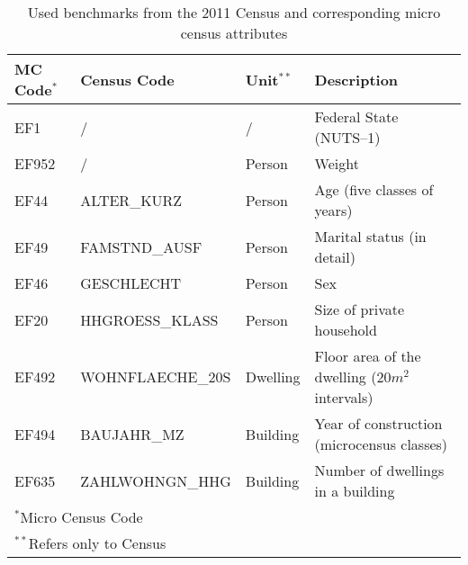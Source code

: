 \begin{table}[htb]
    \centering
    \caption{Used benchmarks from the 2011 Census and corresponding micro
    census attributes}\label{tab:data}
    \begin{tabular}{lllp{5.5cm}}
        \toprule
        \textbf{MC Code$^*$}\cite{NRW.2010} &
        \textbf{Census Code}\cite{NRW.2011} &
        \textbf{Unit$^{**}$} &
        \textbf{Description}\\
        \midrule
EF1       & / & /      & Federal State (NUTS--1)\\
EF952     & / & Person & Weight\\
EF44      & ALTER\_KURZ      & Person    & Age (five classes of years)\\
EF49      & FAMSTND\_AUSF    & Person    & Marital status (in detail)\\
EF46      & GESCHLECHT       & Person    & Sex\\
EF20      & HHGROESS\_KLASS  & Person    & Size of private household\\
          \midrule
EF492     & WOHNFLAECHE\_20S & Dwelling  & Floor area of the dwelling (20$m^2$ intervals)\\
          \midrule
EF494     & BAUJAHR\_MZ      & Building  & Year of construction (microcensus classes)\\
EF635     & ZAHLWOHNGN\_HHG  & Building  & Number of dwellings in a building\\
\bottomrule
\multicolumn{4}{l}{$^*$Micro Census Code}\\
\multicolumn{4}{l}{$^{**}$Refers only to Census}
    \end{tabular}
\end{table}


